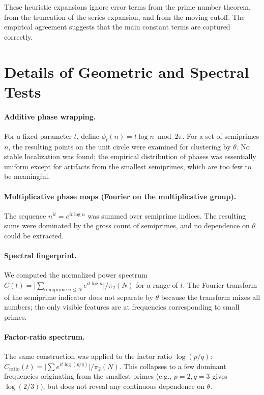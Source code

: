 \documentclass[11pt]{article}
\theoremstyle{definition}
\begin{document}
These heuristic expansions ignore error terms from the prime number theorem, from
the truncation of the series expansion, and from the moving cutoff.  The empirical
agreement suggests that the main constant terms are captured correctly.

\section{Details of Geometric and Spectral Tests}
\label{app:embeddings}

\paragraph{Additive phase wrapping.}
For a fixed parameter \(t\), define \(\phi_t(n) = t\log n \bmod 2\pi\).  For a set of
semiprimes \(n\), the resulting points on the unit circle were examined for
clustering by \(\theta\).  No stable localization was found; the empirical
distribution of phases was essentially uniform except for artifacts from the
smallest semiprimes, which are too few to be meaningful.

\paragraph{Multiplicative phase maps (Fourier on the multiplicative group).}
The sequence \(n^{it} = e^{it\log n}\) was summed over semiprime indices.  The
resulting sums were dominated by the gross count of semiprimes, and no dependence
on \(\theta\) could be extracted.

\paragraph{Spectral fingerprint.}
We computed the normalized power spectrum
\(C(t) = \bigl|\sum_{\text{semiprime }n\le N} e^{it\log n}\bigr| / \pi_2(N)\)
for a range of \(t\).  The Fourier transform of the semiprime indicator does not
separate by \(\theta\) because the transform mixes all numbers; the only visible
features are at frequencies corresponding to small primes.

\paragraph{Factor‑ratio spectrum.}
The same construction was applied to the factor ratio \(\log(p/q)\):
\(C_{\mathrm{ratio}}(t) = \bigl|\sum e^{it\log(p/q)}\bigr| / \pi_2(N)\).  This
collapses to a few dominant frequencies originating from the smallest primes
(e.g., \(p=2,q=3\) gives \(\log(2/3)\)), but does not reveal any continuous
dependence on \(\theta\).
\end{document}
